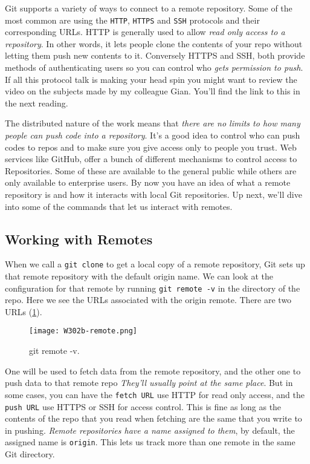	Git supports a variety of ways to connect to a remote repository. Some of the most common are using the \verb|HTTP|, \verb|HTTPS| and \verb|SSH| protocols and their corresponding URLs. 
	HTTP is generally used to allow\textit{ read only access to a repository}. In other words, it lets people clone the contents of your repo without letting them push new contents to it. 
	Conversely HTTPS and SSH, both provide methods of authenticating users so you can control who \textit{gets permission to push}. If all this protocol talk is making your head spin you might want to review the video on the subjects made by my colleague Gian. You'll find the link to this in the next reading.
	
	The distributed nature of the work means that\textit{ there are no limits to how many people can push code into a repository}.
	It's a good idea to control who can push codes to repos and to make sure you give access only to people you trust. Web services like GitHub, offer a bunch of different mechanisms to control access to Repositories. Some of these are available to the general public while others are only available to enterprise users. By now you have an idea of what a remote repository is and how it interacts with local Git repositories. Up next, we'll dive into some of the commands that let us interact with remotes.

	\subsection{Working with Remotes} \label{W302b}

	When we call a \verb|git clone| to get a local copy of a remote repository, Git sets up that remote repository with the default origin name. We can look at the configuration for that remote by running \verb|git remote -v| in the directory of the repo. 
	Here we see the URLs associated with the origin remote. There are two URLs (\ref{W302b-remote}). 
	
	\begin{figure} 
		\caption{git remote -v.}
		\centering
		\texttt{[image: W302b-remote.png]}
		\label{W302b-remote}
	\end{figure} 
	
	One will be used to fetch data from the remote repository, and the other one to push data to that remote repo
	\textit{They'll usually point at the same place}. But in some cases, you can have the \texttt{fetch URL} use HTTP for read only access, and the \texttt{push URL} use HTTPS or SSH for access control. This is fine as long as the contents of the repo that you read when fetching are the same that you write to in pushing. \textit{Remote repositories have a name assigned to them}, by default, the assigned name is \verb|origin|. This lets us track more than one remote in the same Git directory.
	
